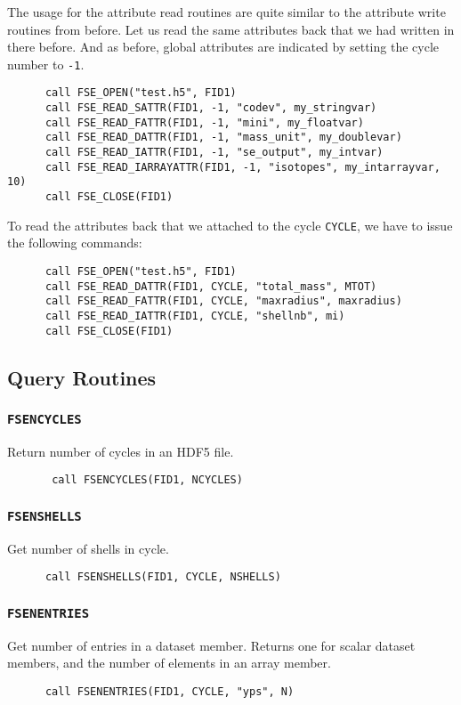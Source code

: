 The usage for the attribute read routines are quite similar to the attribute write routines from before. Let us read the same attributes back that we had written in there before. And as before, global attributes are indicated by setting the cycle number to \verb!-1!.

\begin{verbatim}
      call FSE_OPEN("test.h5", FID1)
      call FSE_READ_SATTR(FID1, -1, "codev", my_stringvar)
      call FSE_READ_FATTR(FID1, -1, "mini", my_floatvar)
      call FSE_READ_DATTR(FID1, -1, "mass_unit", my_doublevar)
      call FSE_READ_IATTR(FID1, -1, "se_output", my_intvar)
      call FSE_READ_IARRAYATTR(FID1, -1, "isotopes", my_intarrayvar, 10)
      call FSE_CLOSE(FID1)
\end{verbatim}

To read the attributes back that we attached to the cycle \verb!CYCLE!, we have to issue the following commands:

\begin{verbatim}
      call FSE_OPEN("test.h5", FID1)
      call FSE_READ_DATTR(FID1, CYCLE, "total_mass", MTOT)
      call FSE_READ_FATTR(FID1, CYCLE, "maxradius", maxradius)
      call FSE_READ_IATTR(FID1, CYCLE, "shellnb", mi)
      call FSE_CLOSE(FID1)
\end{verbatim}

\subsection{Query Routines}

\subsubsection{\texttt{FSENCYCLES}}
Return number of cycles in an HDF5 file.

\begin{verbatim}
       call FSENCYCLES(FID1, NCYCLES)
\end{verbatim}

\subsubsection{\texttt{FSENSHELLS}}
Get number of shells in cycle. 
\begin{verbatim}
      call FSENSHELLS(FID1, CYCLE, NSHELLS)
\end{verbatim}

\subsubsection{\texttt{FSENENTRIES}}
Get number of entries in a dataset member.
Returns one for scalar dataset members, and the number of elements in an array member.\begin{verbatim}
      call FSENENTRIES(FID1, CYCLE, "yps", N)
\end{verbatim}

